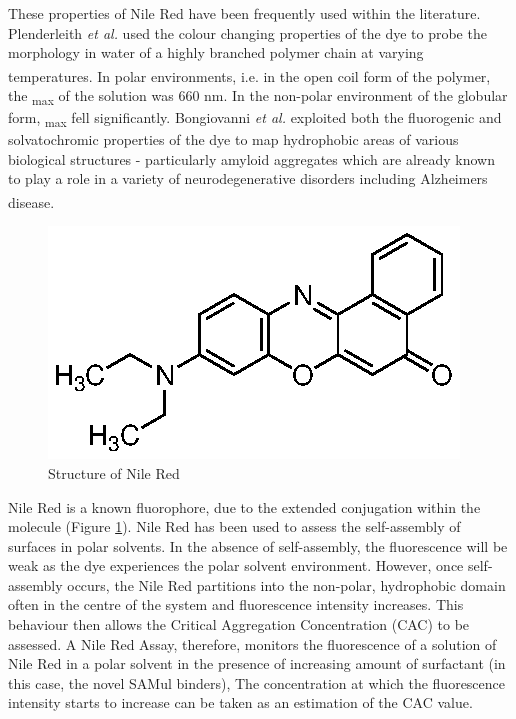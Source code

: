 These properties of Nile Red have been frequently used within the literature. Plenderleith \textit{et al.} used the colour changing properties of the dye to probe the morphology in water of a highly branched polymer chain at varying temperatures.\textsuperscript{\cite{Plenderleith2014Highly-branchedTemperature}} In polar environments, i.e. in the open coil form of the polymer, the \textlambda\textsubscript{max} of the solution was 660 nm. In the non-polar environment of the globular form, \textlambda\textsubscript{max} fell significantly.
\newline 
Bongiovanni \textit{et al.} exploited both the fluorogenic and solvatochromic properties of the dye to map hydrophobic areas of various biological structures - particularly amyloid aggregates which are already known to play a role in a variety of neurodegenerative disorders including Alzheimers disease.\textsuperscript{\cite{Bongiovanni2016Multi-dimensionalMapping}}
\newline
\begin{figure} [ht!]
\centering
\includegraphics{Nile_Red_Assays/Nile_Red_structure.eps}
\caption{Structure of Nile Red}
\label{Nile_red}
\end{figure}

Nile Red is a known fluorophore, due to the extended conjugation within the molecule (Figure \ref{Nile_red}). Nile Red has been used to assess the self-assembly of surfaces in polar solvents. In the absence of self-assembly, the fluorescence will be weak as the dye experiences the polar solvent environment. However, once self-assembly occurs, the Nile Red partitions into the non-polar, hydrophobic domain often in the centre of the system and fluorescence intensity increases. This behaviour then allows the Critical Aggregation Concentration (CAC) to be assessed. A Nile Red Assay, therefore, monitors the fluorescence of a solution of Nile Red in a polar solvent in the presence of increasing amount of surfactant (in this case, the novel SAMul binders), The concentration at which the fluorescence intensity starts to increase can be taken as an estimation of the CAC value. 

